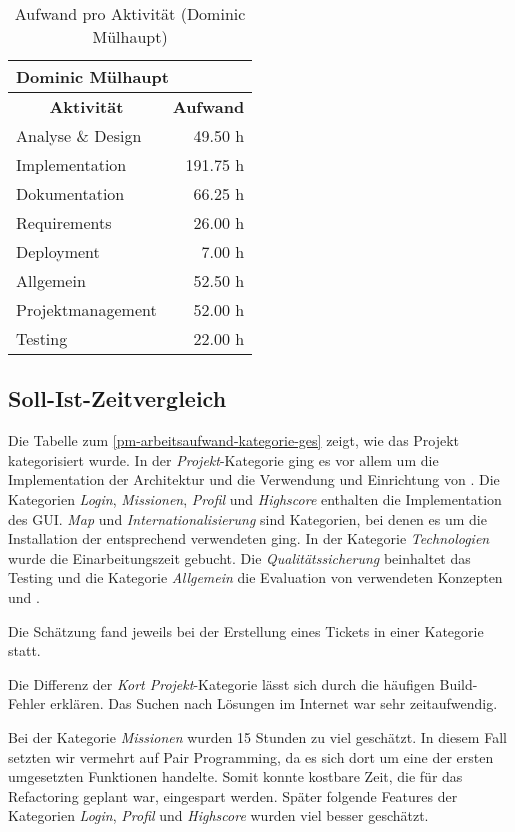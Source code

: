 \begin{table}[H]
\centering
\label{pm-arbeitsaufwand-aktivität-dm}
\begin{tabular}{|l|r|}
\hline
\multicolumn{2}{|l|}{\textbf{Dominic Mülhaupt}} \\
\hline
\multicolumn{1}{|c|}{\textbf{Aktivität}} & \multicolumn{1}{|c|}{\textbf{Aufwand}} \\
\hline
Analyse \& Design & 49.50 h \\
\hline
Implementation & 191.75 h \\
\hline
Dokumentation & 66.25 h \\
\hline
Requirements & 26.00 h \\
\hline
Deployment & 7.00 h \\
\hline
Allgemein & 52.50 h \\
\hline
Projektmanagement & 52.00 h \\
\hline
Testing & 22.00 h \\
\hline
\end{tabular}
\caption{Aufwand pro Aktivität (Dominic Mülhaupt)}
\end{table}


\subsection{Soll-Ist-Zeitvergleich}
Die Tabelle zum \ref{pm-arbeitsaufwand-kategorie-ges} zeigt, wie das Projekt kategorisiert wurde. 
In der \kort{} \textit{Projekt}-Kategorie ging es vor allem um die Implementation der Architektur und die Verwendung und Einrichtung von . 
Die Kategorien \textit{Login}, \textit{Missionen}, \textit{Profil} und \textit{Highscore} enthalten die Implementation des \gls{GUI}. 
\textit{Map} und \textit{Internationalisierung} sind Kategorien, bei denen es um die Installation der entsprechend verwendeten  ging. 
In der Kategorie \textit{Technologien} wurde die Einarbeitungszeit gebucht. 
Die \textit{Qualitätssicherung} beinhaltet das Testing und die Kategorie \textit{Allgemein} die Evaluation von verwendeten Konzepten und .

Die Schätzung fand jeweils bei der Erstellung eines Tickets in einer Kategorie statt. 

Die Differenz der \textit{Kort Projekt}-Kategorie lässt sich durch die häufigen Build-Fehler erklären. 
Das Suchen nach Lösungen im Internet war sehr zeitaufwendig. 

Bei der Kategorie \textit{Missionen} wurden 15 Stunden zu viel geschätzt. 
In diesem Fall setzten wir vermehrt auf \gls{Pair Programming}, da es sich dort um eine der ersten umgesetzten Funktionen handelte.
Somit konnte kostbare Zeit, die für das Refactoring geplant war, eingespart werden. 
Später folgende Features der Kategorien \textit{Login}, \textit{Profil} und \textit{Highscore} wurden viel besser geschätzt.

